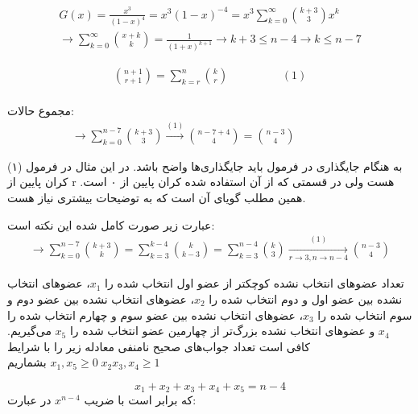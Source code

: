 \documentclass[11pt,largemargins]{h2wp}
\begin{document}
   \begin{align*}
   G(x)= \frac{x^3}{(1-x)^4} = x^3 (1-x)^{-4} = x^3 \sum_{k=0}^{\infty}\binom{k+3}{3} x^k \\ 
   \longrightarrow \sum_{k=0}^{\infty}\binom{x+k}{k} = \frac{1}{(1+x)^{k+1}} 
   \longrightarrow k+3 \le n-4 \rightarrow k \le n-7
   \end{align*}
   
   \begin{align*}
     \binom{n+1}{r+1} = \sum_{k=r}^{n} \binom{k}{r} \hspace{2cm} (1) \\
  \end{align*}
  
   مجموع حالات: 
   \begin{align*}
   \longrightarrow \sum_{k=0}^{n-7}\binom{k+3}{3} \xrightarrow{(1)}  \binom{n-7+4}{4} = \binom{n-3}{4}   \hspace{2cm} 
   \end{align*}
   
   
   
 \notes
 
   به هنگام جایگذاری در فرمول باید جایگذاری‌ها واضح باشد. در این مثال در فرمول (۱) کران پایین از r هست ولی در قسمتی که از آن استفاده شده کران پایین از ۰ است. همین مطلب گویای آن است که به توضیحات بیشتری نیاز هست. 
		
		عبارت زیر صورت کامل شده این نکته است:
		\begin{align*}
		\longrightarrow \sum_{k=0}^{n-7} \binom{k+3}{k} = \sum_{k=3}^{k-4} \binom{k}{k-3} = \sum_{k=3}^{n-4} \binom{k}{3} \xrightarrow[{r \rightarrow 3},{ n \rightarrow {n-4} }]{(1)} \binom{n-3}{4}
\end{align*}	



   تعداد عضو‌های  انتخاب نشده کوچکتر از عضو اول انتخاب شده را 
                $x_1$،
                عضوهای انتخاب نشده بین عضو اول و دوم انتخاب شده را
                $x_2$،
                عضو‌های انتخاب نشده بین عضو دوم و سوم انتخاب شده را
                $x_3$،
                عضو‌های انتخاب نشده بین عضو سوم و چهارم انتخاب شده را
                $x_4$ و
                عضوهای انتخاب نشده بزرگ‌تر از چهارمین عضو انتخاب شده را 
                $x_5$
                می‌گیریم. کافی است تعداد جواب‌های صحیح نامنفی معادله زیر را با شرایط 
                $x_1, x_5 \geq 0 \; x_2 x_3, x_4 \geq 1$
                بشماریم
               
                $$x_1 + x_2 + x_3 + x_4 + x_5 = n - 4$$
                که برابر است با ضریب
                $x^{n - 4}$
                در عبارت:
                
\end{document}
